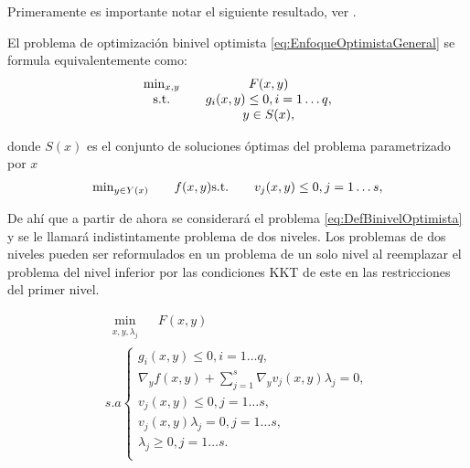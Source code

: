 Primeramente es importante notar el siguiente resultado, ver \cite{Scmidtbiblio}.

\begin{proposition} El problema de optimización binivel optimista \eqref{eq:EnfoqueOptimistaGeneral} se formula equivalentemente como:
\begin{equation}\label{eq:DefBinivelOptimista} 
\begin{matrix}
    \min_{x , y} & \quad F(x, y) \notag \\
    \text{s.t.} & \quad g_i(x, y) \leq 0, i=1\ldots q,  \notag \\
    & \quad y \in S(x), \end{matrix}\end{equation}
  
donde $S(x)$ es el conjunto de soluciones óptimas del problema parametrizado por $x$ 
 \begin{equation}
\begin{matrix}   \min_{y \in Y(x)} & \quad f(x, y)  
    \text{s.t.} & \quad v_j(x, y) \leq 0, j=1\ldots s, \notag \end{matrix}\end{equation}


\end{proposition}
De ah\'i  que a partir de ahora se considerar\'a el problema \eqref{eq:DefBinivelOptimista} y se le llamar\'a indistintamente problema de dos niveles. 
Los  problemas de dos niveles pueden ser reformulados en un problema de un solo nivel al reemplazar el problema del nivel inferior por las condiciones KKT de este en las restricciones del primer nivel. 
		
        
% 
        \begin{equation}\label{eq:KKT_Optimista}   
            \begin{array}{l}
                \underset{\substack{x, y, \lambda_j}}{\min} \quad F(x, y)\\
                s.a \left\{ 
                \begin{array}{l}
                    g_i(x, y) \leq 0, i=1\ldots q,\\
                    \nabla_{y} f(x, y) + \sum_{j=1}^{s} \nabla_{y} v_j(x, y) \lambda_j = 0, \\
                    v_j(x, y) \leq 0, j=1\ldots s,\\
                    v_j(x, y)\lambda_j = 0, j=1\ldots s, \\
                    \lambda_j \geq 0, j=1\ldots s.\\
                \end{array}\right.
            \end{array}
        \end{equation}
     

